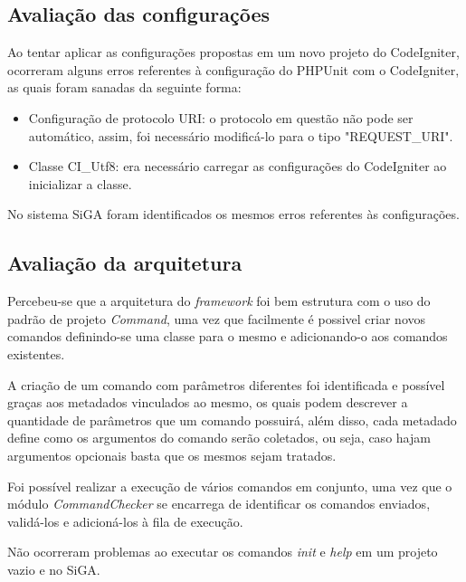       \subsection{Avaliação das configurações}
      
	  Ao tentar aplicar as configurações propostas em um novo projeto do CodeIgniter, ocorreram alguns erros referentes
	  à configuração do PHPUnit com o CodeIgniter, as quais foram sanadas da seguinte forma:
	  
	  \begin{itemize}

	    \item Configuração de protocolo URI: o protocolo em questão não pode ser automático, assim, foi necessário modificá-lo para
	    o tipo "REQUEST\_URI".
	    
	    \item Classe CI\_Utf8: era necessário carregar as configurações do CodeIgniter ao inicializar a classe.

	  \end{itemize}
	  
	  No sistema SiGA foram identificados os mesmos erros referentes às configurações.
      
      \subsection{Avaliação da arquitetura}
	  Percebeu-se que a arquitetura do \textit{framework} foi bem estrutura com o uso do padrão de projeto \textit{Command}, 
	  uma vez que facilmente é possivel criar novos comandos definindo-se uma classe para o mesmo e adicionando-o aos comandos
	  existentes.
	  
	  A criação de um comando com parâmetros diferentes foi identificada e possível graças aos metadados vinculados ao mesmo, 
	  os quais podem descrever a quantidade de parâmetros que um comando possuirá, além disso, cada metadado define como os 
	  argumentos do comando serão coletados, ou seja, caso hajam argumentos opcionais basta que os mesmos sejam tratados.
	  
	  Foi possível realizar a execução de vários comandos em conjunto, uma vez que o módulo \textit{CommandChecker} se encarrega 
	  de identificar os comandos enviados, validá-los e adicioná-los à fila de execução.
	  
	  Não ocorreram problemas ao executar os comandos \textit{init} e \textit{help} em um projeto vazio e no SiGA. 
	  
